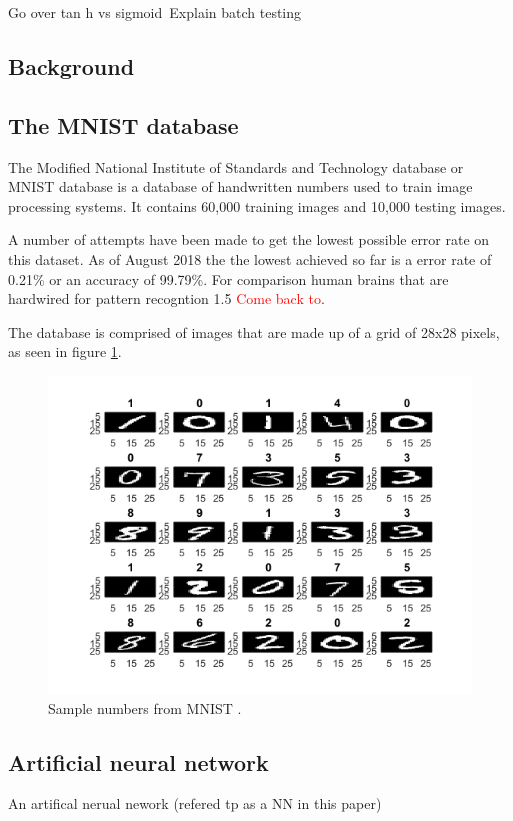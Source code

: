 \documentclass[12pt]{article}
\begin{document}
	Go over tan h vs sigmoid\
	Explain batch testing
	
	\subsection{Background}
	\subsection{The MNIST database}
	The Modified National Institute of Standards and Technology database or MNIST database\cite{mnistDATABASE} is a database of handwritten numbers used to train image processing systems. It contains 60,000 training images and 10,000 testing images. 
	
	A number of attempts have been made to get the lowest possible error rate on this dataset. As of August 2018 the  the lowest achieved so far is a error rate of 0.21\% or an accuracy of 99.79\%.  For comparison human brains that are hardwired for pattern recogntion 1.5 \textcolor{red}{Come back to}\cite{humanPerf}.
	
	The database is comprised of images that are made up of a grid of 28x28 pixels, as seen in figure \ref{fig:mathworksmnistneuralnetfinal}. 
	
	\begin{figure}[H]
		\centering
		\includegraphics[width=0.7\linewidth]{mathworks_mnist_neuralnetFinal}
		\caption{Sample numbers from MNIST \cite{matlabNNBeg}.}
		\label{fig:mathworksmnistneuralnetfinal}
	\end{figure}
	
	\subsection{Artificial neural network}
	An artifical nerual nework (refered tp as a NN in this paper)
	
\end{document}
